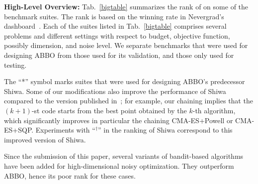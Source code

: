 \textbf{High-Level Overview:} 
Tab.~\ref{bigtable} summarizes the rank of \ngoptq{} on some  of the benchmark suites. The rank is based on the winning rate in Nevergrad's dashboard~\cite{dash}.   
Each of the suites listed in Tab.~\ref{bigtable} comprises several problems and different settings with respect to budget, objective function, possibly dimension, and noise level. We separate benchmarks that were used for designing ABBO from those used for its validation, and those only used for testing. 

The ``*'' symbol marks suites that were used for designing ABBO's predecessor Shiwa. Some of our modifications also improve the performance of Shiwa compared to the version published in~\cite{versatile}; for example, our chaining implies that the $(k+1)$-{st} code starts from the best point obtained by the $k$-th algorithm, which significantly improves in particular the chaining CMA-ES+Powell or CMA-ES+SQP. Experiments with ``$^\dagger$'' in the ranking of Shiwa correspond to this improved version of Shiwa.

Since the submission of this paper, several variants of bandit-based algorithms have been added for high-dimensional noisy optimization. They outperform ABBO, hence its poor rank for these cases. 


